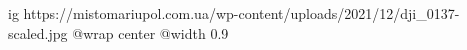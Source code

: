  
 
 
 
 

\ifcmt
  ig https://mistomariupol.com.ua/wp-content/uploads/2021/12/dji_0137-scaled.jpg
  @wrap center
  @width 0.9
\fi
